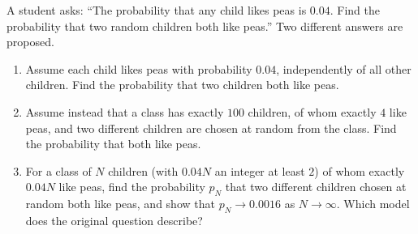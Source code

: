 A student asks: ``The probability that any child likes peas is $0.04$. Find the probability that two random children both like peas.'' Two different answers are proposed.
\begin{enumerate}
\item[(a)] Assume each child likes peas with probability $0.04$, independently of all other children. Find the probability that two children both like peas.
\item[(b)] Assume instead that a class has exactly $100$ children, of whom exactly $4$ like peas, and two different children are chosen at random from the class. Find the probability that both like peas.
\item[(c)] For a class of $N$ children (with $0.04N$ an integer at least $2$) of whom exactly $0.04N$ like peas, find the probability $p_N$ that two different children chosen at random both like peas, and show that $p_N\to0.0016$ as $N\to\infty$. Which model does the original question describe?
\end{enumerate}
